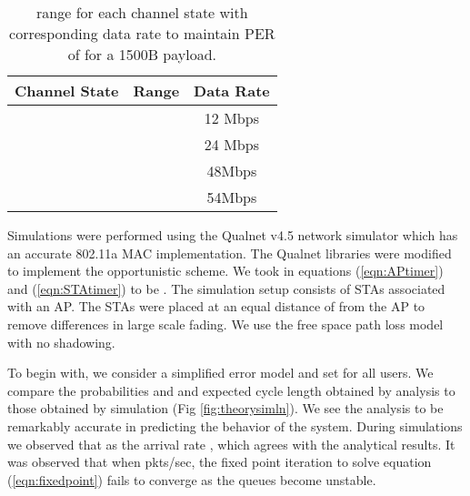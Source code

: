 \documentclass[10pt,conference]{IEEEtran}
\begin{document}
\begin{table}[!ht]
\centering
\caption{ range for each channel state with corresponding data rate to maintain PER of  for a 1500B payload. }
\begin{tabular}{|c|c | c | }
\hline
Channel State & Range &Data Rate\\
\hline
 & &12 Mbps\\
 & &24 Mbps\\
 & &48Mbps\\
 & &54Mbps\\
\hline
\end{tabular}
\label{tab:quantization}
\end{table}

Simulations were performed using the Qualnet v4.5 network simulator which has an accurate 802.11a MAC implementation.
The Qualnet libraries were modified to implement the opportunistic scheme. We took  in equations (\ref{eqn:APtimer}) and (\ref{eqn:STAtimer}) to be . The simulation setup consists of  STAs associated with an AP. 
The STAs were placed at an equal distance of  from the AP to remove differences in large scale fading. We  use the free space path loss model with no shadowing. 

\begin{figure*}
\null\hfill
\hspace{-1em}
\hfill\null
\caption{ comparision of simulations and theory.}
\label{fig:theorysimln}
\end{figure*}

\begin{figure*}[!t]
\null\hfill
\hspace{-1em}
\hfill\null
\caption{Throughput performance of opportunistic scheduling}
\label{fig:oppsimln}
\end{figure*}

To begin with, we consider a simplified error model and set  for all users. We compare the probabilities  and  and expected cycle length  obtained by analysis to those obtained by simulation (Fig \ref{fig:theorysimln}).
We see the analysis to be remarkably accurate in predicting the behavior of the system. During simulations we observed that as the arrival rate ,  which agrees with the analytical results.
 It was  observed that when   pkts/sec, the fixed point iteration to solve equation (\ref{eqn:fixedpoint}) fails to converge as the queues become unstable. 
\end{document}
